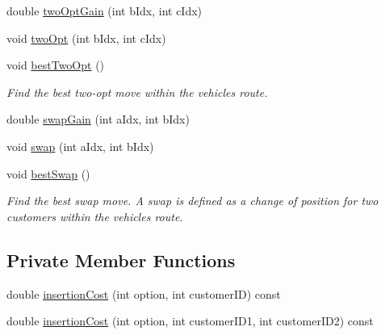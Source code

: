 \begin{DoxyCompactItemize}
double \hyperlink{class_vehicle_a7f113f2b4cc5a27a5aba32c38ef12237}{two\+Opt\+Gain} (int b\+Idx, int c\+Idx)
\item 
void \hyperlink{class_vehicle_a31a85934417d72f5719b06ff1992a9d6}{two\+Opt} (int b\+Idx, int c\+Idx)
\item 
\mbox{\label{class_vehicle_a07a9db33e4e1c2022eaa1031776b82a7}} 
void \hyperlink{class_vehicle_a07a9db33e4e1c2022eaa1031776b82a7}{best\+Two\+Opt} ()
\begin{DoxyCompactList}\small\item\em Find the best two-\/opt move within the vehicle\textquotesingle{}s route. \end{DoxyCompactList}\item 
double \hyperlink{class_vehicle_a738c59dd2399d2bc1198db5e44be3db9}{swap\+Gain} (int a\+Idx, int b\+Idx)
\item 
void \hyperlink{class_vehicle_a5ba7b2efd185ad5b567146c5249a3465}{swap} (int a\+Idx, int b\+Idx)
\item 
\mbox{\label{class_vehicle_ae3da9e9bc42637d5f8d2beac2cf93ef3}} 
void \hyperlink{class_vehicle_ae3da9e9bc42637d5f8d2beac2cf93ef3}{best\+Swap} ()
\begin{DoxyCompactList}\small\item\em Find the best swap move. A swap is defined as a change of position for two customers within the vehicle\textquotesingle{}s route. \end{DoxyCompactList}\end{DoxyCompactItemize}
\subsection*{Private Member Functions}
\begin{DoxyCompactItemize}
\item 
double \hyperlink{class_vehicle_a611644994428f25ca7c1e83d47dc1626}{insertion\+Cost} (int option, int customer\+ID) const
\item 
double \hyperlink{class_vehicle_a8823f29268056ded45bac81098b7d58e}{insertion\+Cost} (int option, int customer\+I\+D1, int customer\+I\+D2) const
\end{DoxyCompactItemize}
